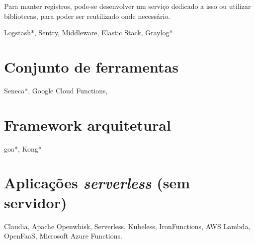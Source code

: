 Para manter registros, pode-se desenvolver um serviço dedicado a isso ou utilizar bibliotecas, para poder ser reutilizado onde necessário.

Logstash*, Sentry, Middleware, Elastic Stack, Graylog*

\section{Conjunto de ferramentas}
Seneca*, Google Cloud Functions,

\section{Framework arquitetural}
goa*, Kong*

\section{Aplicações \emph{serverless} (sem servidor)}
Claudia, Apache Openwhisk, Serverless, Kubeless, IronFunctions, AWS Lambda, OpenFaaS, Microsoft Azure Functions.

